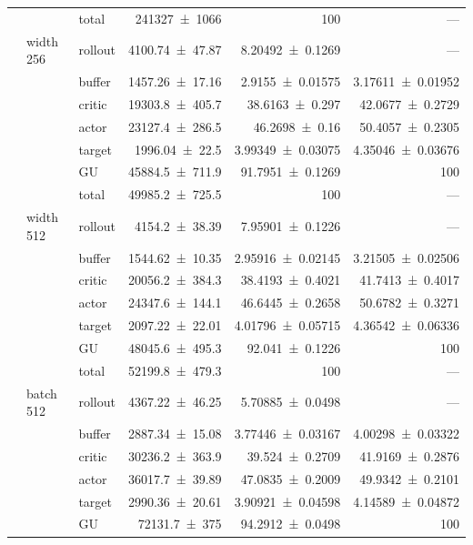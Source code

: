 {\begin{longtable}{@{}lllrrr@{}}
     &  & total & \num{241327+-1066} & \num{100} & --- \\
    \addlinespace[2pt]
     & width 256 & rollout & \num{4100.74+-47.87} & \num{8.20492+-0.1269} & --- \\
     &  & buffer & \num{1457.26+-17.16} & \num{2.9155+-0.01575} & \num{3.17611+-0.01952} \\
     &  & critic & \num{19303.8+-405.7} & \num{38.6163+-0.297} & \num{42.0677+-0.2729} \\
     &  & actor & \num{23127.4+-286.5} & \num{46.2698+-0.16} & \num{50.4057+-0.2305} \\
     &  & target & \num{1996.04+-22.5} & \num{3.99349+-0.03075} & \num{4.35046+-0.03676} \\
     &  & GU & \num{45884.5+-711.9} & \num{91.7951+-0.1269} & 100 \\
     &  & total & \num{49985.2+-725.5} & \num{100} & --- \\
    \addlinespace[2pt]
     & width 512 & rollout & \num{4154.2+-38.39} & \num{7.95901+-0.1226} & --- \\
     &  & buffer & \num{1544.62+-10.35} & \num{2.95916+-0.02145} & \num{3.21505+-0.02506} \\
     &  & critic & \num{20056.2+-384.3} & \num{38.4193+-0.4021} & \num{41.7413+-0.4017} \\
     &  & actor & \num{24347.6+-144.1} & \num{46.6445+-0.2658} & \num{50.6782+-0.3271} \\
     &  & target & \num{2097.22+-22.01} & \num{4.01796+-0.05715} & \num{4.36542+-0.06336} \\
     &  & GU & \num{48045.6+-495.3} & \num{92.041+-0.1226} & 100 \\
     &  & total & \num{52199.8+-479.3} & \num{100} & --- \\
    \addlinespace[2pt]
     & batch 512 & rollout & \num{4367.22+-46.25} & \num{5.70885+-0.0498} & --- \\
     &  & buffer & \num{2887.34+-15.08} & \num{3.77446+-0.03167} & \num{4.00298+-0.03322} \\
     &  & critic & \num{30236.2+-363.9} & \num{39.524+-0.2709} & \num{41.9169+-0.2876} \\
     &  & actor & \num{36017.7+-39.89} & \num{47.0835+-0.2009} & \num{49.9342+-0.2101} \\
     &  & target & \num{2990.36+-20.61} & \num{3.90921+-0.04598} & \num{4.14589+-0.04872} \\
     &  & GU & \num{72131.7+-375} & \num{94.2912+-0.0498} & 100 \\

\end{longtable}}
